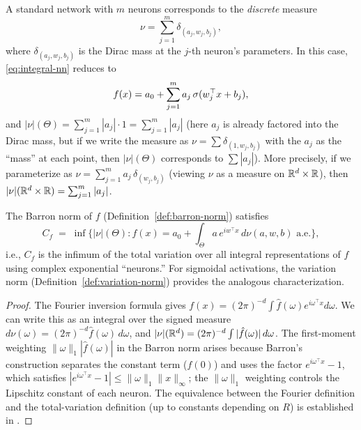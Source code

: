 \documentclass[11pt,a4paper]{article}
\begin{document}
\begin{remark}
\label{rem:finite-discrete}
A standard network with $m$ neurons corresponds to the
\emph{discrete} measure
\[
  \nu = \sum_{j=1}^{m} \delta_{(a_j, w_j, b_j)},
\]
where $\delta_{(a_j, w_j, b_j)}$ is the Dirac mass at the $j$-th neuron's
parameters.  In this case, \eqref{eq:integral-nn} reduces to
\[
  f(x) = a_0 + \sum_{j=1}^{m} a_j \, \sigma(w_j^\top x + b_j),
\]
and $|\nu|(\Theta) = \sum_{j=1}^m |a_j| \cdot 1 = \sum_{j=1}^m |a_j|$
(here $a_j$ is already factored into the Dirac mass, but if we write the
measure as $\nu = \sum \delta_{(1, w_j, b_j)}$ with the $a_j$ as the
``mass'' at each point, then $|\nu|(\Theta)$ corresponds to $\sum |a_j|$).
More precisely, if we parameterize as $\nu = \sum_{j=1}^m a_j \,
\delta_{(w_j, b_j)}$ (viewing $\nu$ as a measure on $\mathbb{R}^d \times \mathbb{R}$), then
$|\nu|(\mathbb{R}^d \times \mathbb{R}) = \sum_{j=1}^m |a_j|$.
\end{remark}

\begin{proposition}
\label{prop:barron-tv}
The Barron norm of $f$ (Definition~\ref{def:barron-norm}) satisfies
\[
  C_f \;=\; \inf \bigl\{ |\nu|(\Theta) :
  f(x) = a_0 + \int_\Theta a \, e^{i w^\top x} \, d\nu(a, w, b)
  \text{ a.e.} \bigr\},
\]
i.e., $C_f$ is the infimum of the total variation over all integral
representations of $f$ using complex exponential ``neurons.''  For
sigmoidal activations, the variation norm
(Definition~\ref{def:variation-norm}) provides the analogous
characterization.
\end{proposition}

\begin{proof}
The Fourier inversion formula gives $f(x) = (2\pi)^{-d} \int \hat{f}
(\omega) e^{i\omega^\top x} d\omega$.  We can write this as an integral
over the signed measure $d\nu(\omega) = (2\pi)^{-d} \hat{f}(\omega) \,
d\omega$, and $|\nu|(\mathbb{R}^d) = (2\pi)^{-d} \int |\hat{f}(\omega)| \,
d\omega$.  The first-moment weighting $\|\omega\|_1 |\hat{f}(\omega)|$
in the Barron norm arises because Barron's construction separates the
constant term ($f(0)$) and uses the factor $e^{i\omega^\top x} - 1$,
which satisfies $|e^{i\omega^\top x} - 1| \le \|\omega\|_1 \|x\|_\infty$;
the $\|\omega\|_1$ weighting controls the Lipschitz constant of each
neuron.  The equivalence between the Fourier definition and the
total-variation definition (up to constants depending on $R$) is
established in \citet[Chapter 7]{bach2024}.
\end{proof}
\end{document}
